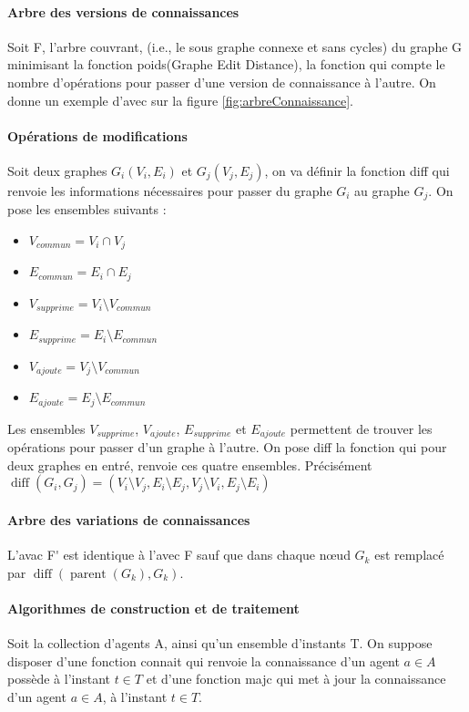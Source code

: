 \documentclass[a4paper]{article}
\DeclareMathOperator{\diff}{diff}
\DeclareMathOperator{\parent}{parent}
\begin{document}
\paragraph{Arbre des versions de connaissances} Soit \gls{F}, l'arbre couvrant,
(i.e., le sous graphe connexe  et sans cycles) du graphe \gls{G} minimisant la
fonction \gls{poids}(Graphe Edit Distance), la fonction qui compte le nombre
d'opérations pour passer d'une version de connaissance à l'autre.  On donne un
exemple d'\gls{avec} sur la figure \ref{fig:arbreConnaissance}.

\paragraph{Opérations de modifications} Soit deux graphes $G_i(V_i, E_i)$ et
$G_j(V_j, E_j)$, on va définir la fonction \gls{diff} qui renvoie les
informations nécessaires pour passer du graphe $G_i$ au graphe $G_j$. On pose
les ensembles suivants :

\begin{itemize}
  \item $V_{commun} =  V_i \cap V_j$
  \item $E_{commun} =  E_i \cap E_j$
  \item $V_{supprime} = V_i \setminus V_{commun}$
  \item $E_{supprime} = E_i \setminus E_{commun}$
  \item $V_{ajoute} = V_j \setminus V_{commun}$
  \item $E_{ajoute} = E_j \setminus E_{commun}$
\end{itemize}

Les ensembles $V_{supprime}$, $V_{ajoute}$, $E_{supprime}$ et $E_{ajoute}$
permettent de trouver les opérations pour passer d'un graphe à l'autre. On pose
\gls{diff} la fonction qui pour deux graphes en entré, renvoie ces quatre
ensembles. Précisément $\diff(G_i,G_j) = (V_i \setminus V_j, E_i \setminus E_j,
V_j \setminus V_i, E_j \setminus E_i)$

\paragraph{Arbre des variations de connaissances} L'\gls{avac} \gls{F'} est
identique à l'\gls{avec} \gls{F} sauf que dans chaque nœud $G_k$ est remplacé
par $\diff(\parent(G_k),G_k)$.

\paragraph{Algorithmes de construction et de traitement} Soit la collection
d'agents \gls{A}, ainsi qu'un ensemble d'instants \gls{T}. On suppose disposer
d'une fonction \gls{connait} qui renvoie la connaissance d'un agent $a\in A$
possède à l'instant $t\in T$ et d'une fonction \gls{majc} qui met à jour la
connaissance d'un agent $a \in A$, à l'instant $t\in T$.
\end{document}
